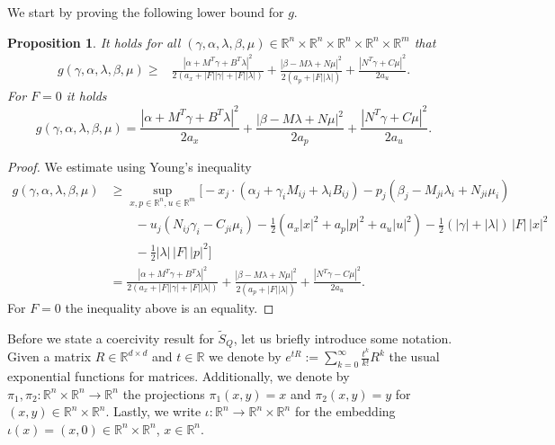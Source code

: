 \documentclass[11pt]{article}
\newcommand{\R}{\mathbb R}
\newtheorem{proposition}{Proposition}[section]
\begin{document}
We start by proving the following lower bound for $g$.

\begin{proposition}\label{prop: lb g}
    It holds for all $(\gamma,\alpha,\lambda,\beta,\mu) \in \R^n \times \R^n \times \R^n \times \R^n \times \R^m$ that
    \begin{align*}
    g(\gamma,\alpha,\lambda,\beta,\mu) \geq &\frac{\left| \alpha + M^T \gamma + B^T \lambda \right|^2}{2 (a_x + |F| |\gamma| + |F| |\lambda|)}  + \frac{\left| \beta - M \lambda + N \mu \right|^2}{2 ( a_p + |F| |\lambda|)}  + \frac{\left| N^T \gamma + C \mu \right|^2}{2a_u} .
    \end{align*}
    For $F = 0$ it holds 
    \[
        g(\gamma,\alpha,\lambda,\beta,\mu) = \frac{\left| \alpha + M^T \gamma + B^T \lambda \right|^2}{2 a_x}  + \frac{\left| \beta - M \lambda + N \mu \right|^2}{2  a_p }  + \frac{\left| N^T \gamma + C \mu \right|^2}{2a_u} .
    \]
\end{proposition}
\begin{proof}
    We estimate using Young's inequality
    \begin{align*}
    g(\gamma,\alpha,\lambda,\beta,\mu) &\geq \sup_{x,p \in\R^n, u \in \R^m} \bigg[-x_j \cdot ( \alpha_j + \gamma_i M_{ij} + \lambda_i B_{ij} ) - p_j ( \beta_j -  M_{ji} \lambda_i + N_{ji} \mu_i ) \\ & \qquad - u_j ( N_{ij} \gamma_i - C_{ji} \mu_i)   - \frac12\left( a_x |x |^2 + a_p |p|^2 + a_u |u|^2 \right) - \frac12 (|\gamma| + |\lambda|) \, |F| \, |x|^2 \\ & \qquad -  \frac12 |\lambda| \, |F| \, |p|^2 \bigg] \\
    &= \frac{\left| \alpha + M^T \gamma + B^T \lambda \right|^2}{2 (a_x + |F| |\gamma| + |F| |\lambda|)}  + \frac{\left| \beta - M \lambda + N \mu \right|^2}{2 ( a_p + |F| |\lambda|)}  + \frac{\left| N^T \gamma - C \mu \right|^2}{2a_u} .
\end{align*}
For $F =0$ the inequality above is an equality.
\end{proof}

Before we state a coercivity result for $\tilde{S}_Q$, let us briefly introduce some notation.
Given a matrix $R \in \R^{d\times d}$ and $t \in \R$ we denote by $e^{tR} := \sum_{k=0}^{\infty} \frac{t^k}{k!} R^k$ the usual exponential functions for matrices. 
Additionally, we denote by $\pi_1,\pi_2: \R^{n} \times \R^{n} \to \R^n$ the projections $\pi_1(x,y) = x$ and $\pi_2(x,y) = y$ for $(x,y) \in \R^n \times \R^n$. 
Lastly, we write $\iota: \R^n \to \R^{n} \times \R^n$ for the embedding $\iota(x) = (x,0) \in \R^n \times \R^n$, $x\in \R^n$.
\end{document}
